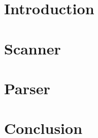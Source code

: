 \documentclass[a4paper, 12pt]{report}
\begin{document}
	


	\tableofcontents	

	\chapter{Introduction}
	
    
	\chapter{Scanner}
	
    
	\chapter{Parser}
	

	\chapter{Conclusion}
	
	
	
\end{document}
